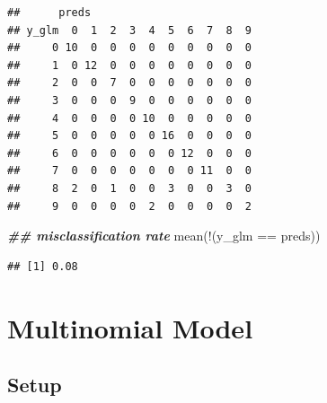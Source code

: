 \documentclass[
]{book}
\newenvironment{Shaded}{\begin{snugshade}}{\end{snugshade}}
\newcommand{\DocumentationTok}[1]{\textcolor[rgb]{0.56,0.35,0.01}{\textbf{\textit{#1}}}}
\newcommand{\FunctionTok}[1]{\textcolor[rgb]{0.00,0.00,0.00}{#1}}
\newcommand{\NormalTok}[1]{#1}
\newcommand{\SpecialCharTok}[1]{\textcolor[rgb]{0.00,0.00,0.00}{#1}}
\begin{document}
\begin{verbatim}
##      preds
## y_glm  0  1  2  3  4  5  6  7  8  9
##     0 10  0  0  0  0  0  0  0  0  0
##     1  0 12  0  0  0  0  0  0  0  0
##     2  0  0  7  0  0  0  0  0  0  0
##     3  0  0  0  9  0  0  0  0  0  0
##     4  0  0  0  0 10  0  0  0  0  0
##     5  0  0  0  0  0 16  0  0  0  0
##     6  0  0  0  0  0  0 12  0  0  0
##     7  0  0  0  0  0  0  0 11  0  0
##     8  2  0  1  0  0  3  0  0  3  0
##     9  0  0  0  0  2  0  0  0  0  2
\end{verbatim}

\begin{Shaded}
\begin{Highlighting}[]
\DocumentationTok{\#\# misclassification rate}
\FunctionTok{mean}\NormalTok{(}\SpecialCharTok{!}\NormalTok{(y\_glm }\SpecialCharTok{==}\NormalTok{ preds))}
\end{Highlighting}
\end{Shaded}

\begin{verbatim}
## [1] 0.08
\end{verbatim}

\hypertarget{multinomial-model}{%
\section{Multinomial Model}\label{multinomial-model}}

\hypertarget{setup-2}{%
\subsection{Setup}\label{setup-2}}
\end{document}

